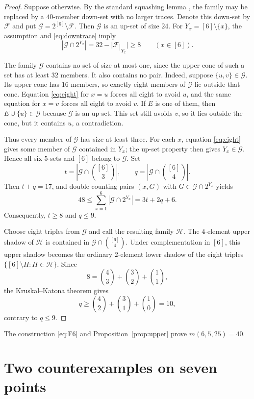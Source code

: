 \documentclass[11pt]{amsart}
\newcommand{\tr}{\mathbin{|}}
\newcommand{\cF}{\mathcal F}
\newcommand{\cG}{\mathcal G}
\newcommand{\cH}{\mathcal H}
\begin{document}
\begin{proof}
Suppose otherwise. By the standard squashing lemma
\cite[Lemma~1.1]{FW}, the family may be replaced by a $40$-member
down-set with no larger traces. Denote this down-set by $\cF$ and put
$\cG=2^{[6]}\setminus\cF$. Then $\cG$ is an up-set of size $24$.
For $Y_x=[6]\setminus\{x\}$, the assumption and
\eqref{eq:downtrace} imply
\begin{equation}\label{eq:eight}
  |\cG\cap2^{Y_x}|=32-|\cF\tr_{Y_x}|\ge8
  \qquad(x\in[6]).
\end{equation}

The family $\cG$ contains no set of size at most one, since the upper
cone of such a set has at least $32$ members. It also contains no pair.
Indeed, suppose $\{u,v\}\in\cG$. Its upper cone has $16$ members, so
exactly eight members of $\cG$ lie outside that cone. Equation
\eqref{eq:eight} for $x=u$ forces all eight to avoid $u$, and the same
equation for $x=v$ forces all eight to avoid $v$. If $E$ is one of
them, then $E\cup\{u\}\in\cG$ because $\cG$ is an up-set. This set
still avoids $v$, so it lies outside the cone, but it contains $u$, a
contradiction.

Thus every member of $\cG$ has size at least three. For each $x$,
equation \eqref{eq:eight} gives some member of $\cG$ contained in
$Y_x$; the up-set property then gives $Y_x\in\cG$. Hence all six
$5$-sets and $[6]$ belong to $\cG$. Set
\[
  t=\left|\cG\cap\binom{[6]}3\right|,
  \qquad
  q=\left|\cG\cap\binom{[6]}4\right|.
\]
Then $t+q=17$, and double counting pairs $(x,G)$ with
$G\in\cG\cap2^{Y_x}$ yields
\[
  48\le\sum_{x=1}^{6}|\cG\cap2^{Y_x}|=3t+2q+6.
\]
Consequently, $t\ge8$ and $q\le9$.

Choose eight triples from $\cG$ and call the resulting family $\cH$.
The $4$-element upper shadow of $\cH$ is contained in
$\cG\cap\binom{[6]}4$. Under complementation in $[6]$, this upper
shadow becomes the ordinary $2$-element lower shadow of the eight
triples $\{[6]\setminus H:H\in\cH\}$. Since
\[
  8=\binom43+\binom32+\binom11,
\]
the Kruskal--Katona theorem \cite{Katona,Kruskal} gives
\[
  q\ge\binom42+\binom31+\binom10=10,
\]
contrary to $q\le9$.
\end{proof}

The construction \eqref{eq:F6} and Proposition~\ref{prop:upper} prove
$m(6,5,25)=40$.

\section{Two counterexamples on seven points}
\end{document}
